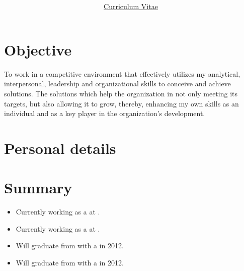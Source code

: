 \documentclass[10pt]{article}
\title{\Huge{\textbf{\myName}}}
\author{\Large{\underline{Curriculum Vitae}}}
\date{}
\begin{document}
\maketitle

\section*{Objective}
To work in a competitive environment that effectively utilizes my analytical, 
interpersonal, leadership and organizational skills to conceive and achieve 
solutions. The solutions which help the organization in not only meeting its 
targets, but also allowing it to grow, thereby, enhancing my own skills as an 
individual and as a key player in the organization's development.

\section*{Personal details}
\begin{personalDetails}


\end{personalDetails}

\section*{Summary}
\begin{itemize}
\begin{comment}
	\item Currently working as a \jobTitle{Graduate Software Engineer} at the 
		\company{Reserve Bank of Australia}.
\end{comment}
	\item Currently working as a  at .
	\item Currently working as a  at  
		.
	\item Will graduate from  with 
		a  in 2012.
	\item Will graduate from  with 
		a  in 2012.
\end{itemize}
\end{document}
